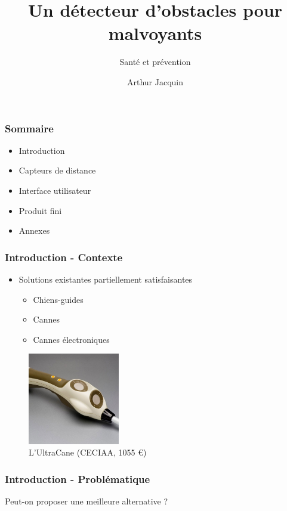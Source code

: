 \documentclass{beamer}
\title{Un détecteur d'obstacles pour malvoyants}
\subtitle{Santé et prévention}
\author{Arthur Jacquin}
\institute{Candidat 27397}
\date{}
\begin{document}
\frame{\titlepage}



\begin{frame}
\frametitle{Sommaire}
\begin{itemize}
\item Introduction
\item Capteurs de distance
\item Interface utilisateur
\item Produit fini
\item Annexes
\end{itemize}
\end{frame}



\begin{frame}
\frametitle{Introduction - Contexte}
\begin{itemize}
\item Solutions existantes partiellement satisfaisantes
    \begin{itemize}
    \item Chiens-guides
    \item Cannes
    \item Cannes électroniques
    \end{itemize}
\end{itemize}
\begin{center}
\begin{figure}
\includegraphics[height=4cm]{images/ultracane.jpg}
\caption{L'UltraCane (CECIAA, 1055 €)}
\end{figure}
\end{center}
\end{frame}



\begin{frame}
\frametitle{Introduction - Problématique}
\begin{center}
Peut-on proposer une meilleure alternative ?
\end{center}
\end{frame}
\end{document}

